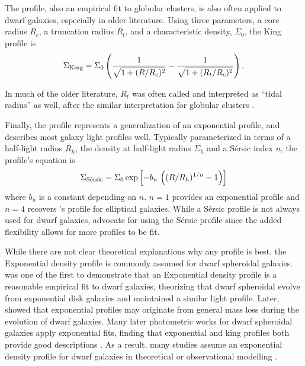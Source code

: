 The \citet{king1962} profile, also an empirical fit to globular
clusters, is also often applied to dwarf galaxies, especially in older
literature. Using three parameters, a core radius \(R_c\), a truncation
radius \(R_t\), and a characteristic density, \(\Sigma_0\), the King
profile is \begin{equation}{
\Sigma_{\rm King} = \Sigma_0\left(\frac{1}{\sqrt{1 + (R/R_c)^2}} - \frac{1}{\sqrt{1+(R_t/R_c)^2}}\right).
}\end{equation}

In much of the older literature, \(R_t\) was often called and
interpreted as ``tidal radius'' as well, after the similar
interpretation for globular clusters
\citep[e.g.,][\citet{hodge1961}]{IH1995}.

Finally, the \citet{sersic1963} profile represents a generalization of
an exponential profile, and describes most galaxy light profiles well.
Typically parameterized in terms of a half-light radius \(R_h\), the
density at half-light radius \(\Sigma_h\) and a Sérsic index \(n\), the
profile's equation is \begin{equation}{
\Sigma_{\rm S\acute ersic} = \Sigma_0 \exp\left[-b_n \,  \left((R/R_h)^{1/n} - 1\right)\right]
}\end{equation} where \(b_n\) is a constant depending on \(n\). \(n=1\)
provides an exponential profile and \(n=4\) recovers
\citet{devaucouleurs1948}'s profile for elliptical galaxies. While a
Sérsic profile is not always used for dwarf galaxies, \citet{munoz+2018}
advocate for using the Sérsic profile since the added flexibility allows
for more profiles to be fit.

While there are not clear theoretical explanations why any profile is
best, the Exponential density profile is commonly assumed for dwarf
spheroidal galaxies. \citet{faber+lin1983} was one of the first to
demonstrate that an Exponential density profile is a reasonable
empirical fit to dwarf galaxies, theorizing that dwarf spheroidal evolve
from exponential disk galaxies and maintained a similar light profile.
Later, \citet{read+gilmore2005} showed that exponential profiles may
originate from general mass loss during the evolution of dwarf galaxies.
Many later photometric works for dwarf spheroidal galaxies apply
exponential fits, finding that exponential and king profiles both
provide good descriptions
\citetext{\citealp[\citet{mateo1998}]{binggeli+sandage+tarenghi1984}; \citealp{mcconnachie+irwin2006}; \citealp{cicuendez+2018}}.
As a result, many studies assume an exponential density profile for
dwarf galaxies in theoretical or observational modelling
\citetext{\citealp[e.g.,][
\citet{MV2020a}]{martin+2016}; \citealp{battaglia+2022}; \citealp[ but
is for disk]{kowalczyk+2013}}.

